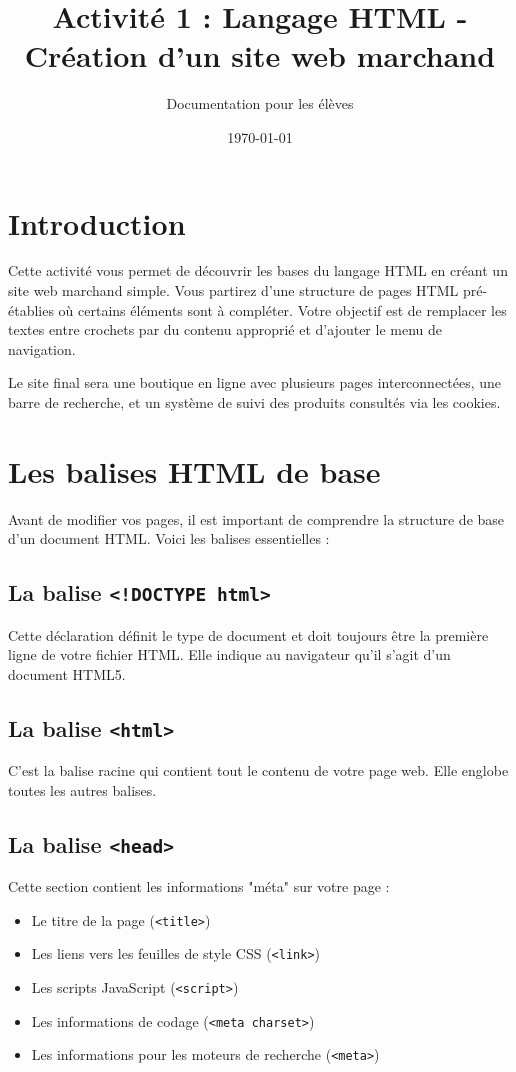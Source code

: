\documentclass[12pt,a4paper]{article}
\title{Activité 1 : Langage HTML - Création d'un site web marchand}
\author{Documentation pour les élèves}
\date{\today}
\begin{document}
\maketitle

\tableofcontents

\newpage

\section{Introduction}

Cette activité vous permet de découvrir les bases du langage HTML en créant un site web marchand simple. Vous partirez d'une structure de pages HTML pré-établies où certains éléments sont à compléter. Votre objectif est de remplacer les textes entre crochets par du contenu approprié et d'ajouter le menu de navigation.

Le site final sera une boutique en ligne avec plusieurs pages interconnectées, une barre de recherche, et un système de suivi des produits consultés via les cookies.

\section{Les balises HTML de base}

Avant de modifier vos pages, il est important de comprendre la structure de base d'un document HTML. Voici les balises essentielles :

\subsection{La balise \texttt{<!DOCTYPE html>}}
Cette déclaration définit le type de document et doit toujours être la première ligne de votre fichier HTML. Elle indique au navigateur qu'il s'agit d'un document HTML5.

\subsection{La balise \texttt{<html>}}
C'est la balise racine qui contient tout le contenu de votre page web. Elle englobe toutes les autres balises.

\subsection{La balise \texttt{<head>}}
Cette section contient les informations "méta" sur votre page :
\begin{itemize}
\item Le titre de la page (\texttt{<title>})
\item Les liens vers les feuilles de style CSS (\texttt{<link>})
\item Les scripts JavaScript (\texttt{<script>})
\item Les informations de codage (\texttt{<meta charset>})
\item Les informations pour les moteurs de recherche (\texttt{<meta>})
\end{itemize}
\end{document}
